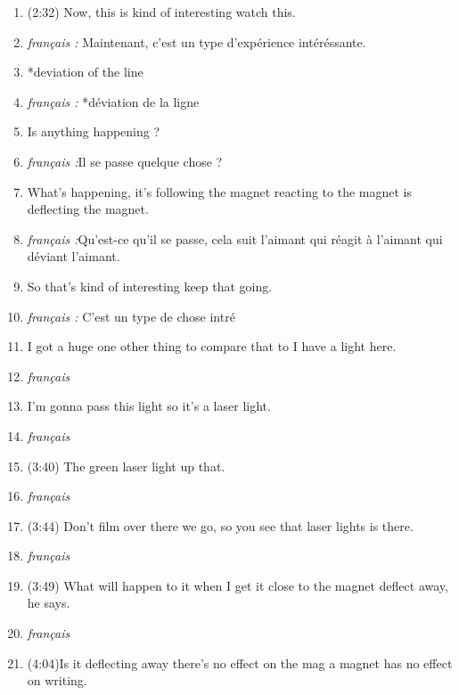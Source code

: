 \documentclass[../main.tex]{subfiles}
\begin{document}
\begin{enumerate}
    \item (2:32) Now, this is kind of interesting watch this.
     \item \hspace*{1cm} \emph{ français :} Maintenant, c'est un type d'expérience intéréssante.
    \item *deviation of the line
     \item \hspace*{1cm} \emph{ français :} *déviation de la ligne
    \item Is anything happening ?
     \item \hspace*{1cm} \emph{ français :}Il se passe quelque chose ?
    \item What's happening, it's following the magnet reacting to the magnet is deflecting the magnet.
     \item \hspace*{1cm} \emph{ français :}Qu'est-ce qu'il se passe, cela suit l'aimant qui réagit à l'aimant qui déviant l'aimant.
    \item So that's kind of interesting keep that going.
     \item \hspace*{1cm} \emph{ français :} C'est un type de chose intré
    \item I got a huge one other thing to compare that to I have a light here.
     \item \hspace*{1cm} \emph{ français }
    \item I'm gonna pass this light so it's a laser light.
     \item \hspace*{1cm} \emph{ français }
    \item (3:40) The green laser light up that.
     \item \hspace*{1cm} \emph{ français }
    \item (3:44) Don't film over there we go, so you see that laser lights is there.
     \item \hspace*{1cm} \emph{ français }
    \item (3:49) What will happen to it when I get it close to the magnet deflect away, he says.
     \item \hspace*{1cm} \emph{ français }
    \item (4:04)Is it deflecting away there's no effect on the mag a magnet has no effect on writing.

\end{enumerate}
\end{document}
